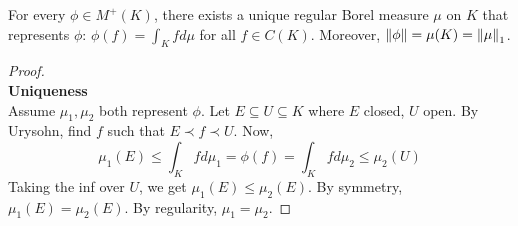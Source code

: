 \documentclass{article}
\begin{document}
\begin{nthm}\label{thm:riesz-rep}
  For every $\phi \in M^+(K)$, there exists a unique regular Borel measure $\mu$ on $K$ that represents $\phi$: $\phi(f) = \int_K f d\mu$ for all $f \in C(K)$. Moreover, $\left\lVert \phi\right\rVert = \mu(K) = \left\lVert \mu\right\rVert_1$.
\end{nthm}
\begin{proof}~\\
  {\bf Uniqueness} \\
  Assume $\mu_1, \mu_2$ both represent $\phi$. Let $E \subseteq U \subseteq K$ where $E$ closed, $U$ open. By Urysohn, find $f$ such that $E \prec f \prec U$. Now,
  $$\mu_1(E) \le \int_K f d\mu_1 = \phi(f) = \int_K f d\mu_2 \le \mu_2(U)$$
  Taking the inf over $U$, we get $\mu_1(E) \le \mu_2(E)$. By symmetry, $\mu_1(E) = \mu_2(E)$. By regularity, $\mu_1 = \mu_2$.


\end{proof}
\end{document}
